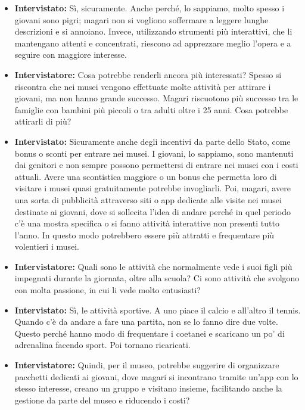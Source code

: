 \documentclass{article}
\begin{document}
\begin{itemize}
    \item \textbf{Intervistato:} Sì, sicuramente. Anche perché, lo sappiamo, molto spesso i giovani sono pigri; magari non si vogliono soffermare a leggere lunghe descrizioni e si annoiano. Invece, utilizzando strumenti più interattivi, che li mantengano attenti e concentrati, riescono ad apprezzare meglio l’opera e a seguire con maggiore interesse.
    
    \item \textbf{Intervistatore:} Cosa potrebbe renderli ancora più interessati? Spesso si riscontra che nei musei vengono effettuate molte attività per attirare i giovani, ma non hanno grande successo. Magari riscuotono più successo tra le famiglie con bambini più piccoli o tra adulti oltre i 25 anni. Cosa potrebbe attirarli di più?
    
    \item \textbf{Intervistato:} Sicuramente anche degli incentivi da parte dello Stato, come bonus o sconti per entrare nei musei. I giovani, lo sappiamo, sono mantenuti dai genitori e non sempre possono permettersi di entrare nei musei con i costi attuali. Avere una scontistica maggiore o un bonus che permetta loro di visitare i musei quasi gratuitamente potrebbe invogliarli. Poi, magari, avere una sorta di pubblicità attraverso siti o app dedicate alle visite nei musei destinate ai giovani, dove si sollecita l’idea di andare perché in quel periodo c’è una mostra specifica o si fanno attività interattive non presenti tutto l’anno. In questo modo potrebbero essere più attratti e frequentare più volentieri i musei.
    
    \item \textbf{Intervistatore:} Quali sono le attività che normalmente vede i suoi figli più impegnati durante la giornata, oltre alla scuola? Ci sono attività che svolgono con molta passione, in cui li vede molto entusiasti?
    
    \item \textbf{Intervistato:} Sì, le attività sportive. A uno piace il calcio e all’altro il tennis. Quando c’è da andare a fare una partita, non se lo fanno dire due volte. Questo perché hanno modo di frequentare i coetanei e scaricano un po’ di adrenalina facendo sport. Poi tornano ricaricati.
    
    \item \textbf{Intervistatore:} Quindi, per il museo, potrebbe suggerire di organizzare pacchetti dedicati ai giovani, dove magari si incontrano tramite un’app con lo stesso interesse, creano un gruppo e visitano insieme, facilitando anche la gestione da parte del museo e riducendo i costi?
    

\end{itemize}
\end{document}
